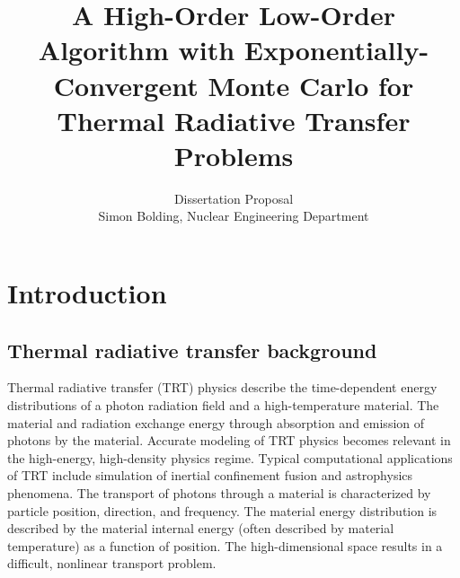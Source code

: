 \documentclass[11pt]{article}
\title{A High-Order Low-Order Algorithm with Exponentially-Convergent Monte Carlo for Thermal Radiative Transfer Problems}
\author{Dissertation Proposal \\ Simon Bolding, Nuclear Engineering Department}
\begin{document}
\singlespace
\maketitle

\doublespace
\setcounter{secnumdepth}{2}


\section{Introduction}

\subsection{Thermal radiative transfer background}

Thermal radiative transfer (TRT) physics describe the time-dependent energy distributions of a photon
radiation field and a high-temperature material.  The material and radiation exchange
energy through absorption and emission of photons by the material.  
Accurate modeling of TRT physics becomes relevant in the high-energy,
high-density physics regime. Typical computational applications of TRT include simulation of inertial confinement fusion and
astrophysics phenomena. 
 The transport of
photons through a material is characterized by particle position, direction, and
frequency.  The material energy distribution is described by the material internal
energy (often described by material temperature) as a function of position.  The
high-dimensional space results in a difficult, nonlinear transport problem.
\end{document}
